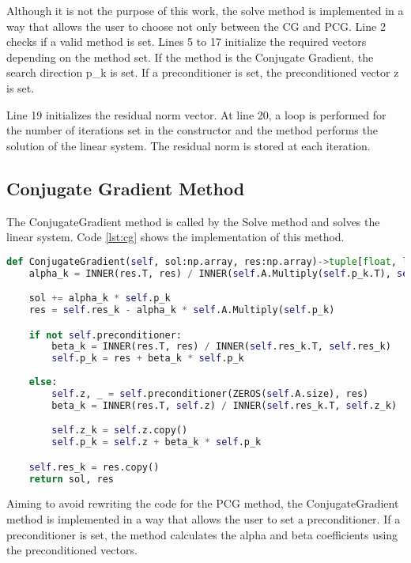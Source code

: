 Although it is not the purpose of this work, the solve method is implemented in a way that allows the user to choose not only between the CG and PCG. Line 2 checks if a valid method is set. Lines 5 to 17 initialize the required vectors depending on the method set. If the method is the Conjugate Gradient, the search direction p\_k is set. If a preconditioner is set, the preconditioned vector z is set. 

Line 19 initializes the residual norm vector. At line 20, a loop is performed for the number of iterations set in the constructor and the method performs the solution of the linear system. The residual norm is stored at each iteration.

\subsection{Conjugate Gradient Method}\label{sec:cg}
The ConjugateGradient method is called by the Solve method and solves the linear system. Code \ref{lst:cg} shows the implementation of this method.
\begin{lstlisting}[language=python, caption={ConjugateGradient method implementation}, label={lst:cg}]
def ConjugateGradient(self, sol:np.array, res:np.array)->tuple[float, list[float]]:
    alpha_k = INNER(res.T, res) / INNER(self.A.Multiply(self.p_k.T), self.p_k) if not self.preconditioner else INNER(self.res_k.T, self.z) / INNER(self.A.Multiply(self.p_k.T), self.p_k)

    sol += alpha_k * self.p_k
    res = self.res_k - alpha_k * self.A.Multiply(self.p_k)

    if not self.preconditioner:
        beta_k = INNER(res.T, res) / INNER(self.res_k.T, self.res_k)
        self.p_k = res + beta_k * self.p_k
    
    else:
        self.z, _ = self.preconditioner(ZEROS(self.A.size), res)
        beta_k = INNER(res.T, self.z) / INNER(self.res_k.T, self.z_k)

        self.z_k = self.z.copy()
        self.p_k = self.z + beta_k * self.p_k

    self.res_k = res.copy()
    return sol, res
\end{lstlisting}

Aiming to avoid rewriting the code for the PCG method, the ConjugateGradient method is implemented in a way that allows the user to set a preconditioner. If a preconditioner is set, the method calculates the alpha and beta coefficients using the preconditioned vectors.

